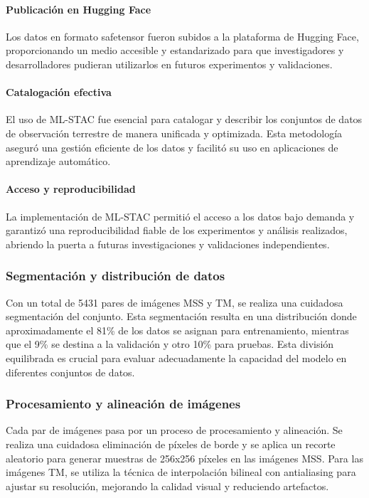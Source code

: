                 \paragraph{Publicación en Hugging Face}
                    Los datos en formato safetensor fueron subidos a la plataforma de Hugging Face, proporcionando un medio accesible y estandarizado para que investigadores y desarrolladores pudieran utilizarlos en futuros experimentos y validaciones.

                \paragraph{Catalogación efectiva}
                    El uso de ML-STAC fue esencial para catalogar y describir los conjuntos de datos de observación terrestre de manera unificada y optimizada. Esta metodología aseguró una gestión eficiente de los datos y facilitó su uso en aplicaciones de aprendizaje automático.

                \paragraph{Acceso y reproducibilidad}
                    La implementación de ML-STAC permitió el acceso a los datos bajo demanda y garantizó una reproducibilidad fiable de los experimentos y análisis realizados, abriendo la puerta a futuras investigaciones y validaciones independientes.

            \subsubsection{Segmentación y distribución de datos}
                Con un total de 5431 pares de imágenes MSS y TM, se realiza una cuidadosa segmentación del conjunto. Esta segmentación resulta en una distribución donde aproximadamente el 81\% de los datos se asignan para entrenamiento, mientras que el 9\% se destina a la validación y otro 10\% para pruebas. Esta división equilibrada es crucial para evaluar adecuadamente la capacidad del modelo en diferentes conjuntos de datos.
            
            \subsubsection{Procesamiento y alineación de imágenes} 
                Cada par de imágenes pasa por un proceso de procesamiento y alineación. Se realiza una cuidadosa eliminación de píxeles de borde y se aplica un recorte aleatorio para generar muestras de 256x256 píxeles en las imágenes MSS. Para las imágenes TM, se utiliza la técnica de interpolación bilineal con antialiasing para ajustar su resolución, mejorando la calidad visual y reduciendo artefactos.
            
